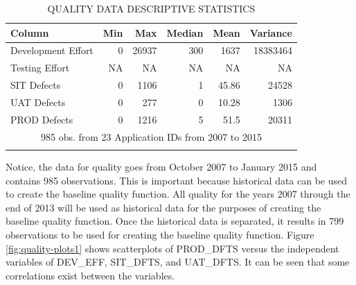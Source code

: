 \documentclass[SDSUThesis.tex]{subfiles}
\begin{document}
        
        \begin{longtable}{@{}l rr rrr}
            \toprule%
             \centering%
             {\bfseries Column}
             & {\bfseries Min}
             & {\bfseries Max}
             & {\bfseries Median}
             & {\bfseries Mean}
             & {\bfseries Variance} \\
            
            \cmidrule[0.2pt](r{0.125em}){1-1}%
            \cmidrule[0.2pt](lr{0.125em}){2-2}%
            \cmidrule[0.2pt](l{0.125em}){3-3}%
            \cmidrule[0.2pt](l{0.125em}){4-4}%
            \cmidrule[0.2pt](l{0.125em}){5-5}%
            \cmidrule[0.2pt](l{0.125em}){6-6}%
            \endhead
            
            Development Effort & 0 & 26937 & 300 & 1637 & 18383464 \\
            \myrowcolour%
            Testing Effort & NA & NA & NA & NA  & NA\\
            SIT Defects & 0 & 1106 & 1 & 45.86 & 24528 \\
            \myrowcolour%
            UAT Defects & 0 & 277 & 0 & 10.28 & 1306 \\
            PROD Defects & 0 & 1216 & 5 & 51.5 & 20311 \\
            
            \bottomrule
            
            \multicolumn{6}{c}{985 obs. from 23 Application IDs from 2007 to 2015} \\
            
            \caption{QUALITY DATA DESCRIPTIVE STATISTICS}
            \label{tab:quality_desc}
        \end{longtable}
        
        Notice, the data for quality goes from October 2007 to January 2015
        and contains 985 observations.
        This is important because historical data can be used to create the
        baseline quality function.  All quality for the years 2007 through 
        the end of 2013
        will be used as historical data for the purposes of creating
        the baseline quality function.  Once the historical data is separated,
        it results in 799 observations to be used for creating the baseline
        quality function.  Figure \ref{fig:quality-plots1} shows scatterplots
        of PROD\_DFTS versus the independent variables of DEV\_EFF, SIT\_DFTS,
        and UAT\_DFTS.  It can be seen that some correlations exist between
        the variables.
        
\end{document}
